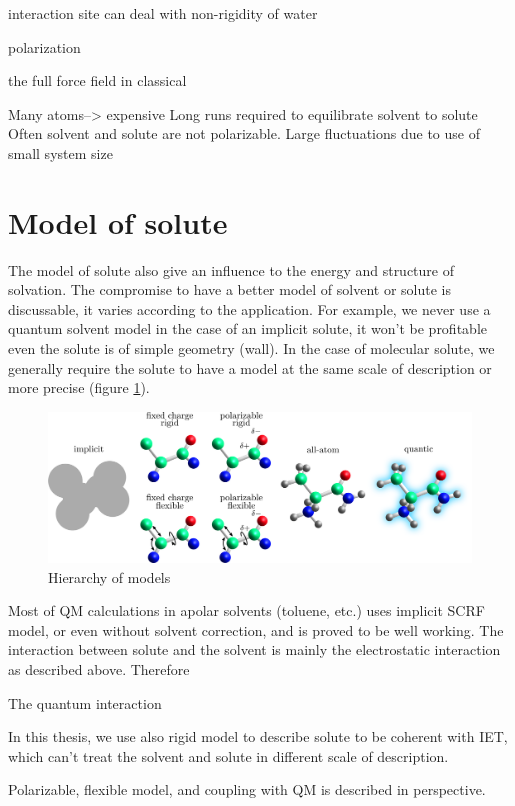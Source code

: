 interaction site can deal with non-rigidity of water

polarization

the full force field in classical

Many atoms--> expensive Long runs required to equilibrate solvent
to solute Often solvent and solute are not polarizable. Large fluctuations
due to use of small system size 


\section{Model of solute}

The model of solute also give an influence to the energy and structure
of solvation. The compromise to have a better model of solvent or
solute is discussable, it varies according to the application. For
example, we never use a quantum solvent model in the case of an implicit
solute, it won't be profitable even the solute is of simple geometry
(wall). In the case of molecular solute, we generally require the
solute to have a model at the same scale of description or more precise
(figure \ref{fig:Hierarchy-of-models}).

\begin{flushright}
\begin{figure}[h]
\raggedleft{}%
\begin{minipage}[t]{1.1\columnwidth}%
\begin{center}
\includegraphics[width=1\columnwidth]{_figure/solute}
\par\end{center}%
\end{minipage}\caption{Hierarchy of models\label{fig:Hierarchy-of-models}}
\end{figure}

\par\end{flushright}

Most of \acs{QM} calculations in apolar solvents (toluene, etc.)
uses implicit SCRF model, or even without solvent correction, and
is proved to be well working. The interaction between solute and the
solvent is mainly the electrostatic interaction as described above.
Therefore 

The quantum interaction 

In this thesis, we use also rigid model to describe solute to be coherent
with IET, which can't treat the solvent and solute in different scale
of description. 

Polarizable, flexible model, and coupling with QM is described in
perspective.
